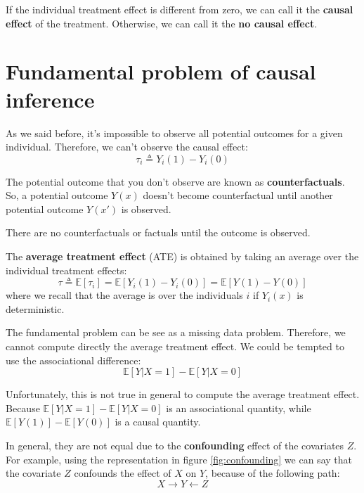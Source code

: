 \begin{nota}
    If the individual treatment effect is different from zero, we can call it
    the \textbf{causal effect} of the treatment. Otherwise, we can call it the
    \textbf{no causal effect}.
\end{nota}

\section{Fundamental problem of causal inference}
As we said before, it's impossible to observe all potential outcomes for a given
individual. Therefore, we can't observe the causal effect:
\begin{equation*}
    \tau_i \triangleq Y_i(1) - Y_i(0)
\end{equation*}

The potential outcome that you don't observe are known as \textbf{counterfactuals}.
So, a potential outcome $Y(x)$ doesn't become counterfactual until another
potential outcome $Y(x')$ is observed.

\begin{nota}
    There are no counterfactuals or factuals until the outcome is observed.
\end{nota}
\begin{definition}
    The \textbf{average treatment effect} (ATE) is obtained by taking an average
    over the individual treatment effects:
    \begin{equation}
        \tau \triangleq \mathbb{E}[\tau_i] = \mathbb{E}[Y_i(1) - Y_i(0)] = \mathbb{E}[Y(1) - Y(0)]
    \end{equation}
    where we recall that the average is over the individuals $i$ if $Y_i(x)$ is
    deterministic.
\end{definition}

The fundamental problem can be see as a missing data problem. Therefore, we cannot
compute directly the average treatment effect. We could be tempted to use the
associational difference:
\begin{equation}
    \mathbb{E}[Y|X = 1] - \mathbb{E}[Y|X = 0]
\end{equation}

Unfortunately, this is not true in general to compute the average treatment effect.
Because $\mathbb{E}[Y|X = 1] - \mathbb{E}[Y|X = 0]$ is an associational quantity,
while $\mathbb{E}[Y(1)] - \mathbb{E}[Y(0)]$ is a causal quantity.

In general, they are not equal due to the \textbf{confounding} effect of the covariates
$Z$. For example, using the representation in figure \ref{fig:confounding} we can
say that the covariate $Z$ confounds the effect of $X$ on $Y$, because of the
following path:
\begin{equation*}
    X \rightarrow Y \leftarrow Z
\end{equation*}

